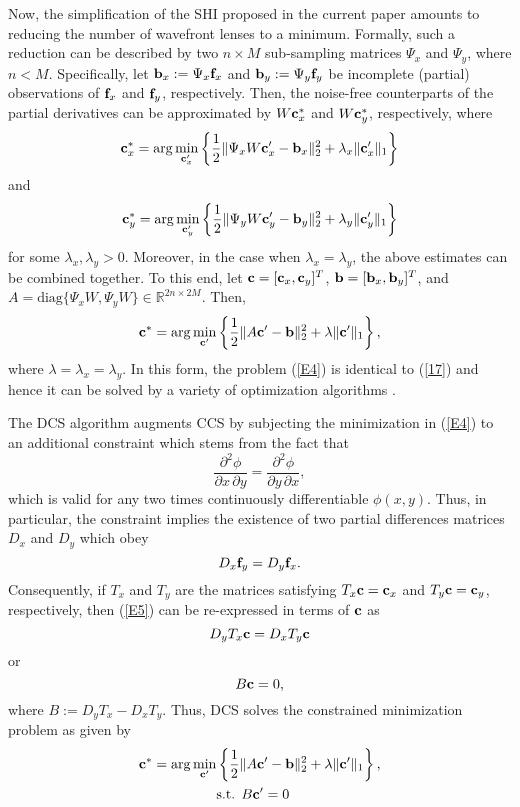 \pdfoutput=1 \documentclass[journal]{IEEEtran}
\newcommand{\ffx}{{\bf f}_x}
\newcommand{\ffy}{{\bf f}_y}
\newcommand{\ccx}{{\bf c}_x}
\newcommand{\ccy}{{\bf c}_y}
\newcommand{\cc}{{\bf c}}
\newcommand{\bbx}{{\bf b}_x}
\newcommand{\bby}{{\bf b}_y}
\newcommand{\bb}{{\bf b}}
\begin{document}
Now, the simplification of the SHI proposed in the current paper amounts to reducing the number of wavefront lenses to a minimum. Formally, such a reduction can be described by two $n \times M$ sub-sampling matrices $\Psi_x$ and $\Psi_y$, where $n < M$. Specifically, let $\bbx := \Psi_x \ffx$ and $\bby := \Psi_y \ffy$ be incomplete (partial) observations of $\ffx$ and $\ffy$, respectively. Then, the noise-free counterparts of the partial derivatives can be approximated by $W \ccx^\ast$ and $W \ccy^\ast$, respectively, where
\begin{equation}
\ccx^\ast = \arg \min_{\ccx^\prime} \left\{ \frac{1}{2} \| \Psi_x W \ccx^\prime - \bbx \|_2^2  + \lambda_x \| \ccx^\prime \|_1 \right\}
\end{equation}
and
\begin{equation}
\ccy^\ast = \arg \min_{\ccy^\prime} \left\{ \frac{1}{2} \| \Psi_y W \ccy^\prime - \bby \|_2^2  + \lambda_y \| \ccy^\prime \|_1 \right\}
\end{equation}
for some $\lambda_x, \lambda_y > 0$. Moreover, in the case when $\lambda_x = \lambda_y$, the above estimates can be combined together. To this end, let $\cc = [\ccx, \ccy]^T$, $\bb = [\bbx, \bby]^T$, and $A = \mbox{diag} \{\Psi_x W, \Psi_y W\} \in \mathbb{R}^{2 n \times 2 M}$. Then,
\begin{equation} \label{E4}
\cc^\ast = \arg \min_{\cc^\prime} \left\{ \frac{1}{2} \| A \cc^\prime - \bb \|_2^2  + \lambda \| \cc^\prime \|_1 \right\},
\end{equation}
where $\lambda=\lambda_x = \lambda_y$. In this form, the problem (\ref{E4}) is identical to (\ref{17}) and hence it can be solved by a variety of optimization algorithms \cite{20, 21}.

The DCS algorithm augments CCS by subjecting the minimization in (\ref{E4}) to an additional constraint which stems from the fact that \cite{14}
\begin{equation} \label{20}
\frac{\partial^2 \phi}{\partial x \, \partial y}=\frac{\partial^2 \phi}{\partial y \, \partial x},
\end{equation}
which is valid for any two times continuously differentiable $\phi(x,y)$. Thus, in particular, the constraint implies the existence of two partial differences matrices $D_x$ and $D_y$ which obey
\begin{equation} \label{E5}
D_x \ffy = D_y \ffx.
\end{equation}
Consequently, if $T_x$ and $T_y$ are the matrices satisfying $T_x \cc = \ccx$ and $T_y \cc = \ccy$, respectively, then (\ref{E5}) can be re-expressed in terms of $\cc$ as
\begin{equation}
D_y T_x \cc = D_x T_y \cc
\end{equation}
or
\begin{equation}
B \cc = 0,
\end{equation}
where $B := D_y T_x - D_x T_y$. Thus, DCS solves the constrained minimization problem as given by
\begin{align} \label{E5}
\cc^\ast = \arg \min_{\cc^\prime} &\left\{ \frac{1}{2} \| A \cc^\prime - \bb \|_2^2  + \lambda \| \cc^\prime \|_1 \right\}, \\
&\mbox{s.t.  } B \cc^\prime = 0 \notag
\end{align}
\end{document}
